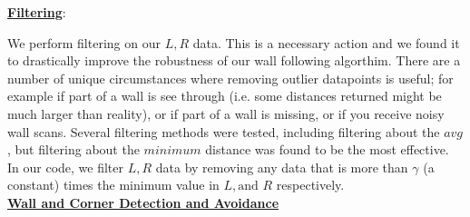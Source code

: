 \documentclass{article}
\begin{document}
\textbf{\underline{Filtering}}: 

We perform filtering on our $L,R$ data. This is a necessary action and we found it to drastically improve the robustness of our wall following algorthim. There are a number of unique circumstances where removing outlier datapoints is useful; for example if part of a wall is see through (i.e. some distances returned might be much larger than reality), or if part of a wall is missing, or if you receive noisy wall scans. Several filtering methods were tested, including filtering about the $avg$, but filtering about the $minimum$ distance was found to be the most effective. In our code, we filter $L,R$ data by removing any data that is more than $\gamma$ (a constant) times the minimum value in $L,\textrm{and }R$ respectively.\\

\textbf{\underline{Wall and Corner Detection and Avoidance}}
\end{document}
